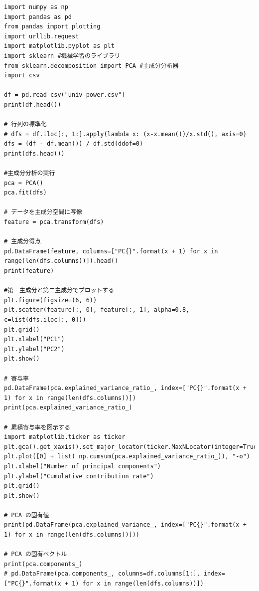 \documentclass[dvipdfmx,autodetect-engine,titlepage]{jsarticle}
\begin{document}
\begin{lstlisting}[caption=pythonプログラム,label=1]
import numpy as np
import pandas as pd
from pandas import plotting 
import urllib.request 
import matplotlib.pyplot as plt
import sklearn #機械学習のライブラリ
from sklearn.decomposition import PCA #主成分分析器
import csv

df = pd.read_csv("univ-power.csv")
print(df.head())

# 行列の標準化
# dfs = df.iloc[:, 1:].apply(lambda x: (x-x.mean())/x.std(), axis=0)
dfs = (df - df.mean()) / df.std(ddof=0)
print(dfs.head())

#主成分分析の実行
pca = PCA()
pca.fit(dfs)

# データを主成分空間に写像
feature = pca.transform(dfs)

# 主成分得点
pd.DataFrame(feature, columns=["PC{}".format(x + 1) for x in range(len(dfs.columns))]).head()
print(feature)

#第一主成分と第二主成分でプロットする
plt.figure(figsize=(6, 6))
plt.scatter(feature[:, 0], feature[:, 1], alpha=0.8, c=list(dfs.iloc[:, 0]))
plt.grid()
plt.xlabel("PC1")
plt.ylabel("PC2")
plt.show()

# 寄与率
pd.DataFrame(pca.explained_variance_ratio_, index=["PC{}".format(x + 1) for x in range(len(dfs.columns))])
print(pca.explained_variance_ratio_)

# 累積寄与率を図示する
import matplotlib.ticker as ticker
plt.gca().get_xaxis().set_major_locator(ticker.MaxNLocator(integer=True))
plt.plot([0] + list( np.cumsum(pca.explained_variance_ratio_)), "-o")
plt.xlabel("Number of principal components")
plt.ylabel("Cumulative contribution rate")
plt.grid()
plt.show()

# PCA の固有値
print(pd.DataFrame(pca.explained_variance_, index=["PC{}".format(x + 1) for x in range(len(dfs.columns))]))

# PCA の固有ベクトル
print(pca.components_)
# pd.DataFrame(pca.components_, columns=df.columns[1:], index=["PC{}".format(x + 1) for x in range(len(dfs.columns))])


\end{lstlisting}
\end{document}
